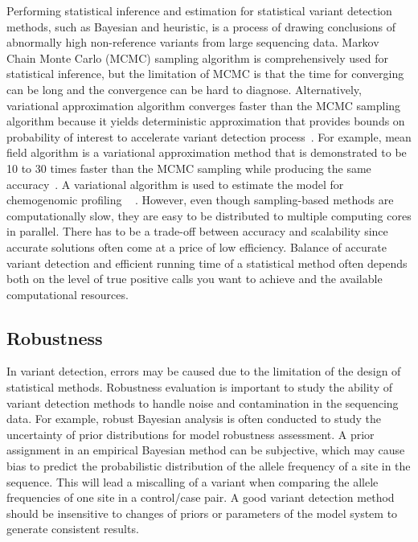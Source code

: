 \documentclass[a4,center,fleqn]{NAR}
\begin{document}
Performing statistical inference and estimation for statistical variant detection methods, such as Bayesian and heuristic, is a process of drawing conclusions of abnormally high non-reference variants from large sequencing data. 
Markov Chain Monte Carlo (MCMC) sampling algorithm is comprehensively used for statistical inference, but the limitation of MCMC is that the time for converging can be long and the convergence can be hard to diagnose.
Alternatively, variational approximation algorithm converges faster than the MCMC sampling algorithm because it yields deterministic approximation that provides bounds on probability of interest to accelerate variant detection process~\citep{jordan1999introduction}.
For example, mean field algorithm is a variational approximation method that is demonstrated to be 10 to 30 times faster than the MCMC sampling while producing the same accuracy~\citep{peterson1989explorations}.
A variational algorithm is used to estimate the model for chemogenomic profiling ~\citep{flaherty2005latent} .
However, even though sampling-based methods are computationally slow, they are easy to be distributed to multiple computing cores in parallel.
There has to be a trade-off between accuracy and scalability since accurate solutions often come at a price of low efficiency.
Balance of accurate variant detection and efficient running time of a statistical method often depends both on the level of true positive calls you want to achieve and the available computational resources.

\subsection{Robustness}

In variant detection, errors may be caused due to the limitation of the design of statistical methods.
Robustness evaluation is important to study the ability of variant detection methods to handle noise and contamination in the sequencing data. 
For example, robust Bayesian analysis is often conducted to study the uncertainty of prior distributions for model robustness assessment.
A prior assignment in an empirical Bayesian method can be subjective, which may cause bias to predict the probabilistic distribution of the allele frequency of a site in the sequence.
This will lead a miscalling of a variant when comparing the allele frequencies of one site in a control/case pair.
A good variant detection method should be insensitive to changes of priors or parameters of the model system to generate consistent results.
\end{document}
